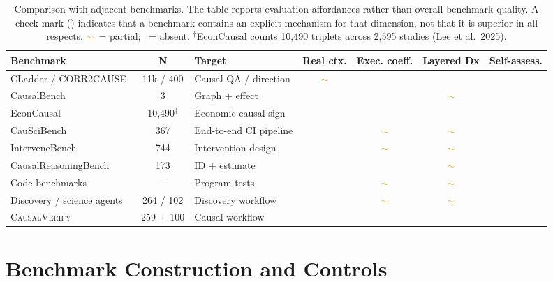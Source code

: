 \documentclass{article}
\newcommand{\Lpass}{\textcolor{passgreen}{\ding{51}}}
\newcommand{\Lfail}{\textcolor{failred}{\ding{55}}}
\newcommand{\Lpart}{\textcolor{orange}{$\sim$}}
\newcommand{\bench}{\textsc{CausalVerify}}
\begin{document}
\begin{table}[H]
\centering
\caption{Comparison with adjacent benchmarks. The table reports
evaluation affordances rather than overall benchmark quality. A check
mark (\Lpass) indicates that a benchmark contains an explicit mechanism
for that dimension, not that it is superior in all respects.
\Lpart~= partial; \Lfail~= absent. $^{\dagger}$EconCausal counts
10{,}490 triplets across 2{,}595 studies (Lee et al.\ 2025).}
\label{tab:benchmark_comparison}
\footnotesize
\renewcommand{\arraystretch}{1.08}
\setlength{\tabcolsep}{2.5pt}
\begin{tabularx}{\textwidth}{lclcccc}
\toprule
\textbf{Benchmark} & \textbf{N} & \textbf{Target} &
\textbf{Real ctx.} & \textbf{Exec. coeff.} &
\textbf{Layered Dx} & \textbf{Self-assess.} \\
\midrule
CLadder / CORR2CAUSE~\citep{jin2023cladder,jin2024corr2cause} & 11k / 400 & Causal QA / direction
  & \Lpart & \Lfail & \Lfail & \Lfail \\
CausalBench~\citep{zhou2024causalbench} & 3 & Graph + effect
  & \Lfail & \Lfail & \Lpart & \Lfail \\
EconCausal~\citep{lee2025econcausal} & 10{,}490$^{\dagger}$ & Economic causal sign
  & \Lpass & \Lfail & \Lfail & \Lfail \\
CauSciBench~\citep{acharya2025causcibench} & 367 & End-to-end CI pipeline
  & \Lpass & \Lpart & \Lpart & \Lfail \\
InterveneBench~\citep{shi2026intervenebench} & 744 & Intervention design
  & \Lpass & \Lpart & \Lpart & \Lfail \\
CausalReasoningBench~\citep{sawarni2026causalreasoningbenchmark} & 173 & ID + estimate
  & \Lpass & \Lfail & \Lpart & \Lfail \\
Code benchmarks~\citep{chen2021codex,jimenez2024swe} & -- & Program tests
  & \Lfail & \Lpart & \Lpart & \Lfail \\
Discovery / science agents~\citep{majumder2024discoverybench,chen2024scienceagentbench} & 264 / 102 & Discovery workflow
  & \Lpass & \Lpart & \Lpart & \Lfail \\
\rowcolor{lightblue}
\bench{} & 259 + 100 & Causal workflow
  & \Lpass & \Lpass & \Lpass & \Lpass \\
\bottomrule
\end{tabularx}
\end{table}

\section{Benchmark Construction and Controls}
\end{document}
